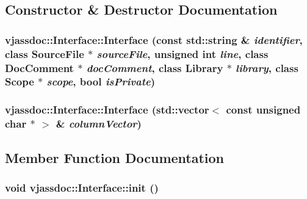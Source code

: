 \subsection{Constructor \& Destructor Documentation}
\hypertarget{classvjassdoc_1_1Interface_b6c3fb74c0fb4aa7af5cf6dcd7050197}{
\subsubsection{\setlength{\rightskip}{0pt plus 5cm}vjassdoc::Interface::Interface (const std::string \& {\em identifier}, class {\bf SourceFile} $\ast$ {\em sourceFile}, unsigned int {\em line}, class {\bf DocComment} $\ast$ {\em docComment}, class {\bf Library} $\ast$ {\em library}, class {\bf Scope} $\ast$ {\em scope}, bool {\em isPrivate})}}
\label{classvjassdoc_1_1Interface_b6c3fb74c0fb4aa7af5cf6dcd7050197}


\hypertarget{classvjassdoc_1_1Interface_6f5c7df2965d2be79bb46d3c4453d862}{
\subsubsection{\setlength{\rightskip}{0pt plus 5cm}vjassdoc::Interface::Interface (std::vector$<$ const unsigned char $\ast$ $>$ \& {\em columnVector})}}
\label{classvjassdoc_1_1Interface_6f5c7df2965d2be79bb46d3c4453d862}




\subsection{Member Function Documentation}
\hypertarget{classvjassdoc_1_1Interface_e10d2a4a6acf44897145bf76675b9da1}{
\subsubsection{\setlength{\rightskip}{0pt plus 5cm}void vjassdoc::Interface::init ()}}
\label{classvjassdoc_1_1Interface_e10d2a4a6acf44897145bf76675b9da1}




